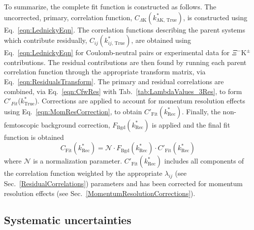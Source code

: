 \documentclass[ALICE,manyauthors]{cernphprep}
\newcommand{\ktrue}{$k^{*}_{\mathrm{True}}$\xspace}
\newcommand{\XiKpm}{$\Xi^{-}\mathrm{K^{\pm}}$\xspace}
\begin{document}
To summarize, the complete fit function is constructed as follows.
The uncorrected, primary, correlation function, $C_{\Lambda\mathrm{K}}(k^{*}_{\mathrm{\Lambda K,\,True}})$, is constructed using Eq.\ \ref{eqn:LednickyEqn}.
The correlation functions describing the parent systems which contribute residually, $C_{ij}(k^{*}_{ij,\,\mathrm{True}})$, are obtained using Eq.\ \ref{eqn:LednickyEqn} for Coulomb-neutral pairs or experimental data for \XiKpm contributions.
The residual contributions are then found by running each parent correlation function through the appropriate transform matrix, via Eq.\ \ref{eqn:ResidualsTransform}.
The primary and residual correlations are combined, via Eq.\ \ref{eqn:CfwRes} with Tab.\ \ref{tab:LambdaValues_3Res}, to form $C'_{Fit}$(\ktrue).
Corrections are applied to account for momentum resolution effects using Eq.\ \ref{eqn:MomResCorrection}, to obtain $C'_{\mathrm{Fit}}(k^{*}_{\mathrm{Rec}})$.
Finally, the non-femtoscopic background correction, $F_{\mathrm{Bgd}}(k^{*}_{\mathrm{Rec}})$ is applied and the final fit function is obtained 
\begin{equation}
C_{\mathrm{Fit}}(k^{*}_{\mathrm{Rec}}) = \mathcal{N}\cdot F_{\mathrm{Bgd}}(k^{*}_{\mathrm{Rec}})\cdot C'_{\mathrm{Fit}}(k^{*}_{\mathrm{Rec}})
\end{equation}
where $\mathcal{N}$ is a normalization parameter.
$C'_{\mathrm{Fit}}(k^{*}_{\mathrm{Rec}})$ includes all components of the correlation function weighted by the appropriate $\lambda_{ij}$ (see Sec.\ \ref{ResidualCorrelations}) parameters and has been corrected for momentum resolution effects (see Sec.\ \ref{MomentumResolutionCorrections}).

\subsection{Systematic uncertainties}
\label{SysErrs}
\end{document}
